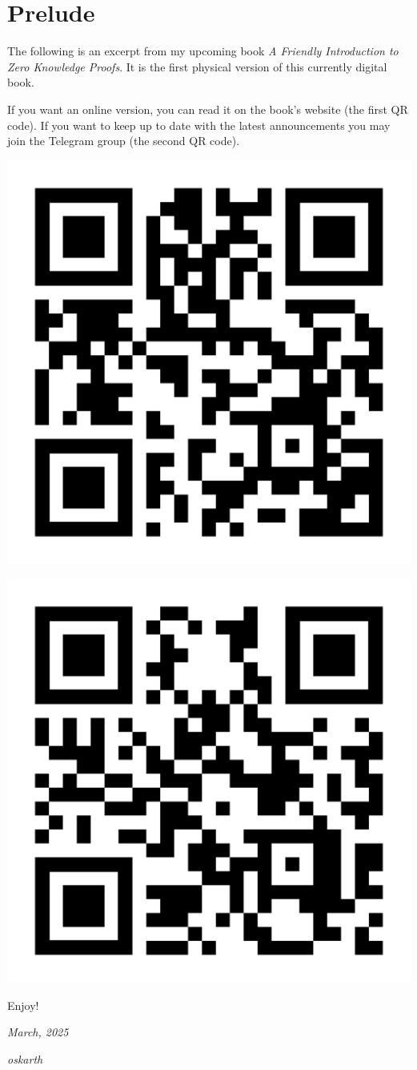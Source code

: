 \section*{Prelude}
\vspace{0.5cm}

The following is an excerpt from my upcoming book \textit{A Friendly Introduction to Zero Knowledge Proofs}. 
It is the first physical version of this currently digital book.

If you want an online version, you can read it on the book's website (the first QR code).
If you want to keep up to date with the latest announcements you may join the Telegram group (the second QR code).

\vspace{1cm}

\begin{center}
\includegraphics[width=0.3\linewidth]{content/assets/zkintro_website_qrcode.png}
\end{center}

\vspace{0.5cm}

\begin{center}
\includegraphics[width=0.3\linewidth]{content/assets/zkintro_tg_group_qrcode.png}
\end{center}

\vspace{0.5cm}

Enjoy!

\textit{March, 2025}

\textit{oskarth}

\thispagestyle{empty}